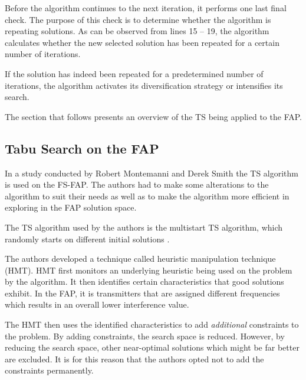 Before the algorithm continues to the next iteration, it performs one last final check. The purpose of this check is to determine whether the algorithm is repeating solutions. As can be observed from lines 15 -- 19, the algorithm calculates whether the new selected solution has been repeated for a certain number of iterations. 

If the solution has indeed been repeated for a predetermined number of iterations, the algorithm activates its diversification strategy or intensifies its search.

The section that follows presents an overview of the TS being applied to the FAP.
\subsection{Tabu Search on the FAP}
In a study conducted by Robert Montemanni and Derek Smith \cite{TabuMontemanniSmith} the TS algorithm is used on the FS-FAP. The authors had to make some alterations to the algorithm to suit their needs as well as to make the algorithm more efficient in exploring in the FAP solution space.

The TS algorithm used by the authors is the multistart TS algorithm, which randomly starts on different initial solutions \cite{TabuMontemanniSmith}.

The authors developed a technique called heuristic manipulation technique (HMT). HMT first monitors an underlying heuristic being used on the problem by the algorithm\cite{TabuMontemanniSmith}. It then identifies certain characteristics that good solutions exhibit. In the FAP, it is transmitters that are assigned different frequencies which results in an overall lower interference value\cite{TabuMontemanniSmith}.

The HMT then uses the identified characteristics to add \emph{additional} constraints to the problem\cite{TabuMontemanniSmith}. By adding constraints, the search space is reduced. However, by reducing the search space, other near-optimal solutions which might be far better are excluded\cite{TabuMontemanniSmith}. It is for this reason that the authors opted not to add the constraints permanently.

